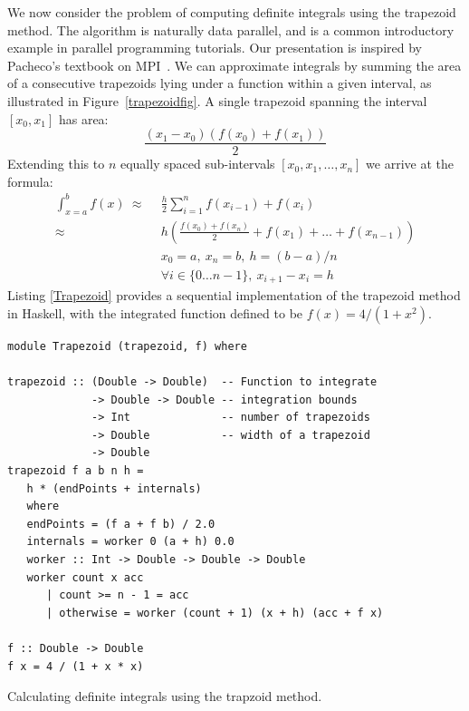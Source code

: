 \documentclass{tmr}
\begin{document}
We now consider the problem of computing definite integrals
using the trapezoid method. The algorithm is naturally data parallel, and is a common
introductory example in parallel programming tutorials. Our presentation is inspired by
Pacheco's textbook on MPI~\cite{Pacheco}.
We can approximate integrals by summing the area of a consecutive
trapezoids lying under a function within a given interval, as illustrated in
Figure~\ref{trapezoidfig}. A single trapezoid spanning the interval
$[x_0,x_1]$ has area:
\begin{equation*}
\frac{(x_1 - x_0)(f(x_0) + f(x_1))}{2}
\end{equation*}
Extending this to $n$ equally spaced sub-intervals $[x_0,x_1,\ldots,x_n]$ we arrive at the formula:
\begin{equation*}
\begin{split}
\int_{x=a}^{b} f(x)\ \approx\ &\ \frac{h}{2} \sum_{i=1}^n f(x_{i-1}) + f(x_i) \\[3mm]
                     \approx\ &\ h \left(\frac{f(x_0) + f(x_n)}{2} + f(x_1) + \ldots + f(x_{n-1})\right) \\[3mm]
                     &\ x_0 = a,\ x_n = b,\ h = (b - a)/n\\
                     &\ \forall i \in \{0 \ldots n-1\},\ x_{i+1} - x_{i} = h
\end{split}
\end{equation*}
Listing \ref{Trapezoid} provides a sequential implementation of the trapezoid method in Haskell, with
the integrated function defined to be $f(x) = 4 / (1 + x^2)$.

\begin{listing}
\begin{Verbatim}
module Trapezoid (trapezoid, f) where

trapezoid :: (Double -> Double)  -- Function to integrate
             -> Double -> Double -- integration bounds
             -> Int              -- number of trapezoids
             -> Double           -- width of a trapezoid
             -> Double
trapezoid f a b n h =
   h * (endPoints + internals)
   where
   endPoints = (f a + f b) / 2.0
   internals = worker 0 (a + h) 0.0
   worker :: Int -> Double -> Double -> Double
   worker count x acc
      | count >= n - 1 = acc
      | otherwise = worker (count + 1) (x + h) (acc + f x)

f :: Double -> Double
f x = 4 / (1 + x * x)
\end{Verbatim}
\caption{Calculating definite integrals using the trapzoid method. \label{Trapezoid}}
\end{listing}
\end{document}
